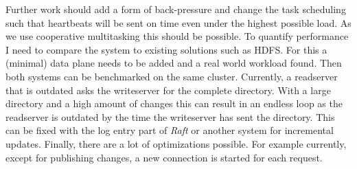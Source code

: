 Further work should add a form of back-pressure and change the task scheduling such that heartbeats will be sent on time even under the highest possible load. As we use cooperative multitasking this should be possible.
To quantify performance I need to compare the system to existing solutions such as HDFS. For this a (minimal) data plane needs to be added and a real world workload found. Then both systems can be benchmarked on the same cluster.
Currently, a readserver that is outdated asks the writeserver for the complete directory. With a large directory and a high amount of changes this can result in an endless loop as the readserver is outdated by the time the writeserver has sent the directory. This can be fixed with the log entry part of \textit{Raft} or another system for incremental updates.
Finally, there are a lot of optimizations possible. For example currently, except for publishing changes, a new connection is started for each request.
